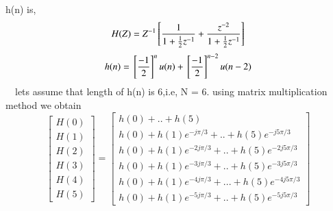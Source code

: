 \documentclass[journal,12pt,twocolumn]{IEEEtran}
\renewcommand\thesection{\arabic{section}}
\begin{document}
\begin{enumerate}[label=\thesection.\arabic*.,ref=\thesection.\theenumi]
 h(n) is,
\begin{align}
 H(Z)= Z^{-1}{}\left[\frac{1}{1+\frac{1}{2}z^{-1}} + \frac{z^{-2}}{1+\frac{1}{2}z^{-1}}\right]
\end{align}
\begin{align}
 h(n)={}\left[\frac{-1}{2}\right]^nu(n) + {}\left[\frac{-1}{2}\right]^{n-2}u(n-2)
\end{align}
\
\
lets  assume that length of h(n) is 6,i.e, N = 6.
using matrix multiplication method we obtain
\begin{equation}
\begin{bmatrix} H(0) \\ H(1) \\ H(2) \\ H(3) \\ H(4) \\ H(5) \end{bmatrix}
=
\begin{bmatrix}
 h(0)+..+h(5)\\h(0)+h(1)e^{-j\pi/3}+..+h(5)e^{-j5\pi/3}\\h(0)+h(1)e^{-2j\pi/3}+..+h(5)e^{-2j5\pi/3}\\h(0)+h(1)e^{-3j\pi /3}+..+h(5)e^{-3j5\pi/3}\\h(0)+h(1)e^{-4j\pi /3}+...+h(5)e^{-4j5\pi/3}\\h(0)+h(1)e^{-5j\pi/3}+..+h(5)e^{-5j5\pi/3}
\end{bmatrix}
\end{equation}



\end{enumerate}
\end{document}
